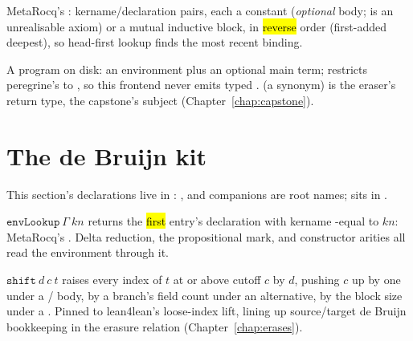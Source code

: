 \begin{definition}
\label{def:GlobalDeclarations}
\leanok
{}
 MetaRocq's : kername/declaration pairs, each a constant (\emph{optional} body;  is an unrealisable axiom) or a mutual inductive block, in \hl{reverse} order (first-added deepest), so head-first lookup finds the most recent binding.
\end{definition}

\begin{definition}[Programs]
\label{def:ASTType}
\leanok
{}
 A \lbox{} program on disk: an environment plus an optional main term;  restricts peregrine's  to , so this frontend never emits typed \lboxT{}.  (a synonym) is the eraser's return type, the capstone's subject (Chapter~\ref{chap:capstone}).
\end{definition}

\section{The de Bruijn kit}
\label{sec:lambdabox:subst}

This section's declarations live in : ,  and companions are root names;  sits in .

\begin{definition}
\label{def:LBTerm-envLookup}
\leanok
{}
 $\mathtt{envLookup}\ \Gamma\ kn$ returns the \hl{first} entry's declaration with kername -equal to $kn$: MetaRocq's . Delta reduction, the propositional mark, and constructor arities all read the environment through it.
\end{definition}

\begin{definition}
\label{def:LBTerm-shift}
\leanok
{}
 $\mathtt{shift}\ d\ c\ t$ raises every index of $t$ at or above cutoff $c$ by $d$, pushing $c$ up by one under a / body, by a branch's field count under an alternative, by the block size under a .
 Pinned to lean4lean's loose-index lift, lining up source/target de Bruijn bookkeeping in the erasure relation (Chapter~\ref{chap:erases}).
\end{definition}

